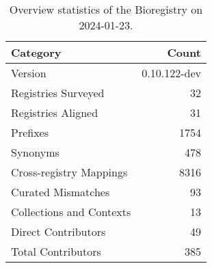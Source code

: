 \begin{table}
\caption{Overview statistics of the Bioregistry on 2024-01-23.}
\label{tab:bioregistry-summary}
\begin{tabular}{lr}
\toprule
Category & Count \\
\midrule
Version & 0.10.122-dev \\
Registries Surveyed & 32 \\
Registries Aligned & 31 \\
Prefixes & 1754 \\
Synonyms & 478 \\
Cross-registry Mappings & 8316 \\
Curated Mismatches & 93 \\
Collections and Contexts & 13 \\
Direct Contributors & 49 \\
Total Contributors & 385 \\
\bottomrule
\end{tabular}
\end{table}
